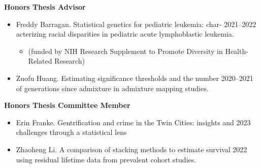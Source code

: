 \documentclass[margin]{res}
\begin{document}
\begin{resume}
\textbf{Honors Thesis Advisor}
\begin{itemize}
\item Freddy Barragan. Statistical genetics for pediatric leukemia: char- \hfill 2021--2022 \\ acterizing racial disparities in pediatric acute lymphoblastic leukemia.
\begin{itemize} \vspace{-0.2cm}
	\item[] 
	\begin{footnotesize}(funded by NIH Research Supplement to Promote Diversity in Health-Related Research) \end{footnotesize}
	\end{itemize} \vspace{-0.1cm}
\item Zuofu Huang. Estimating significance thresholds and the number  \hfill 2020--2021 \\of generations since admixture in admixture mapping studies. %
\end{itemize}

\textbf{Honors Thesis Committee Member}
\begin{itemize}
\item Erin Franke. Gentrification and crime in the Twin Cities: insights and \hfill 2023 \\ challenges through a statistical lens 
\item Zhaoheng Li. A comparison of stacking methods to estimate survival  \hfill 2022 \\ using residual lifetime data from prevalent cohort studies.  %
\end{itemize}




\end{resume}
\end{document}
